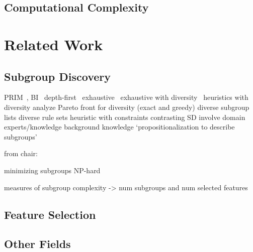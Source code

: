 \documentclass{article}
\theoremstyle{definition}
\begin{document}
\subsection{Computational Complexity}
\label{sec:osd:approach:complexity}

\section{Related Work}
\label{sec:osd:related-work}

\subsection{Subgroup Discovery}
\label{sec:osd:related-work:subgroup-discovery}

PRIM~\cite{friedman1999bump}, BI~\cite{mampaey2012efficient}
depth-first~\cite{millot2020optimal}
exhaustive~\cite{atzmueller2006sd, atzmueller2009fast, grosskreutz2009subgroup, lemmerich2016fast}
exhaustive with diversity~\cite{bosc2018anytime, lemmerich2010fast}
heuristics with diversity \cite{leeuwen2012diverse, lucas2018ssdp+, proencca2022robust}
analyze Pareto front for diversity (exact and greedy) \cite{leeuwen2013discovering}
diverse subgroup lists \cite{lopez2023discovering, lopez2023novel}
diverse rule sets \cite{zhang2020diverse}
heuristic with constraints \cite{lavravc2006relevancy}
contrasting SD \cite{langohr2013contrasting}
involve domain experts/knowledge \cite{dzyuba2013interactive, gamberger2002expert, lemmerich2011local}
background knowledge \cite{atzmueller2005exploiting, atzmueller2006methodological}
`propositionalization to describe subgroups' \cite{zelezny2006propositionalization}

from chair: \cite{arzamasov2021reds} \cite{arzamasov2022pedagogical} \cite{vollmer2019informative}

minimizing subgroups NP-hard~\cite{boley2009non}

measures of subgroup complexity \cite{helal2016subgroup, herrera2011overview, ventura2018subgroup} -> num subgroups and num selected features

\subsection{Feature Selection}
\label{sec:osd:related-work:feature-selection}

\cite{bach2022empirical} \cite{bach2023finding}

\subsection{Other Fields}
\label{sec:osd:related-work:other}
\end{document}
